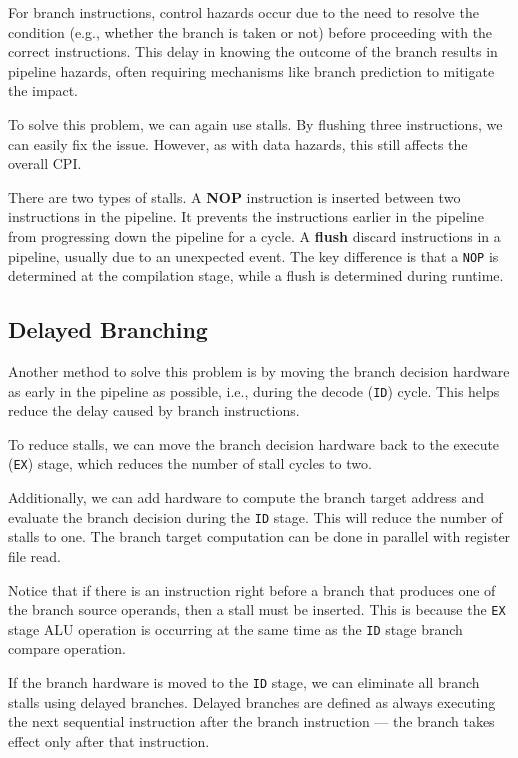 For branch instructions, control hazards occur due to the need to resolve the condition (e.g., whether the branch is taken or not) before proceeding with the correct instructions. This delay in knowing the outcome of the branch results in pipeline hazards, often requiring mechanisms like branch prediction to mitigate the impact.

To solve this problem, we can again use stalls. By flushing three instructions, we can easily fix the issue. However, as with data hazards, this still affects the overall CPI.

\begin{remark}
  There are two types of stalls. A \textbf{NOP} instruction is inserted between two instructions in the pipeline. It prevents the instructions earlier in the pipeline from progressing down the pipeline for a cycle. A \textbf{flush} discard instructions in a pipeline, usually due to an unexpected event. The key difference is that a \verb|NOP| is determined at the compilation stage, while a flush is determined during runtime.
\end{remark}

\subsection{Delayed Branching}
Another method to solve this problem is by moving the branch decision hardware as early in the pipeline as possible, i.e., during the decode (\verb|ID|) cycle. This helps reduce the delay caused by branch instructions.

To reduce stalls, we can move the branch decision hardware back to the execute (\verb|EX|) stage, which reduces the number of stall cycles to two.

Additionally, we can add hardware to compute the branch target address and evaluate the branch decision during the \verb|ID| stage. This will reduce the number of stalls to one. The branch target computation can be done in parallel with register file read.

Notice that if there is an instruction right before a branch that produces one of the branch source operands, then a stall must be inserted. This is because the \texttt{EX} stage ALU operation is occurring at the same time as the \texttt{ID} stage branch compare operation.

If the branch hardware is moved to the \texttt{ID} stage, we can eliminate all branch stalls using delayed branches. Delayed branches are defined as always executing the next sequential instruction after the branch instruction — the branch takes effect only after that instruction.

